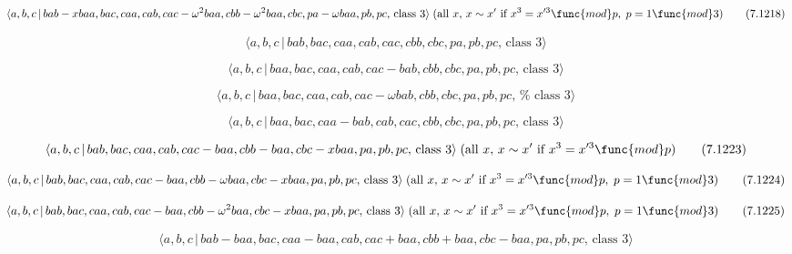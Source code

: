 \documentclass[10pt]{article}
\begin{document}
\begin{equation}
\langle a,b,c\,|\,bab-xbaa,bac,caa,cab,cac-\omega ^{2}baa,cbb-\omega
^{2}baa,cbc,pa-\omega baa,pb,pc,\,\text{class }3\rangle \;(\text{all }x,\,x
\sim x^{\prime }\text{ if }x^3=x^{\prime 3}\func{mod}p,\;p=1\func{mod}3) 
\tag{7.1218}
\end{equation}

\begin{equation}
\langle a,b,c\,|\,bab,bac,caa,cab,cac,cbb,cbc,pa,pb,pc,\,\text{class }%
3\rangle  \tag{7.1219}
\end{equation}

\begin{equation}
\langle a,b,c\,|\,baa,bac,caa,cab,cac-bab,cbb,cbc,pa,pb,pc,\,\text{class }%
3\rangle  \tag{7.1220}
\end{equation}

\begin{equation}
\langle a,b,c\,|\,baa,bac,caa,cab,cac-\omega bab,cbb,cbc,pa,pb,pc,\,\text{%
class }3\rangle  \tag{7.1221}
\end{equation}

\begin{equation}
\langle a,b,c\,|\,baa,bac,caa-bab,cab,cac,cbb,cbc,pa,pb,pc,\,\text{class }%
3\rangle  \tag{7.1222}
\end{equation}

\begin{equation}
\langle a,b,c\,|\,bab,bac,caa,cab,cac-baa,cbb-baa,cbc-xbaa,pa,pb,pc,\,\text{%
class }3\rangle \;(\text{all }x,\,x \sim x^{\prime }\text{ if }x^3=x^{\prime
3}\func{mod}p)  \tag{7.1223}
\end{equation}

\begin{equation}
\langle a,b,c\,|\,bab,bac,caa,cab,cac-baa,cbb-\omega baa,cbc-xbaa,pa,pb,pc,\,%
\text{class }3\rangle \;(\text{all }x,\,x \sim x^{\prime }\text{ if }%
x^3=x^{\prime 3}\func{mod}p,\;p=1\func{mod}3)  \tag{7.1224}
\end{equation}

\begin{equation}
\langle a,b,c\,|\,bab,bac,caa,cab,cac-baa,cbb-\omega
^{2}baa,cbc-xbaa,pa,pb,pc,\,\text{class }3\rangle \;(\text{all }x,\,x \sim
x^{\prime} \text{ if }x^3=x^{\prime 3}\func{mod}p,\;p=1\func{mod}3) 
\tag{7.1225}
\end{equation}

\begin{equation}
\langle a,b,c\,|\,bab-baa,bac,caa-baa,cab,cac+baa,cbb+baa,cbc-baa,pa,pb,pc,\,%
\text{class }3\rangle  \tag{7.1226}
\end{equation}
\end{document}

